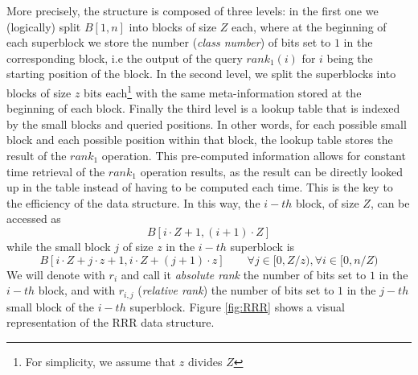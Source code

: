 More precisely, the structure is composed of three levels: in the first one we (logically) split $B[1, n]$ into blocks of size $Z$ each, where at the beginning of each superblock we store the number (\emph{class number}) of bits set to $1$ in the corresponding block, i.e the output of the query $rank_1(i)$ for $i$ being the starting position of the block. In the second level, we split the superblocks into blocks of size $z$ bits each\footnote{For simplicity, we assume that $z$ divides $Z$} with the same meta-information stored at the beginning of each block. Finally the third level is a lookup table that is indexed by the small blocks and queried positions. In other words, for each possible small block and each possible position within that block, the lookup table stores the result of the $rank_1$ operation. This pre-computed information allows for constant time retrieval of the $rank_1$ operation results, as the result can be directly looked up in the table instead of having to be computed each time. This is the key to the efficiency of the data structure. In this way, the $i-th$ block, of size $Z$, can be accessed as
\[
    B[i \cdot Z + 1, (i+1) \cdot Z]
\]
while the small block $j$ of size $z$ in the $i-th$ superblock is
\[
    B[i \cdot Z + j \cdot z + 1, i \cdot Z + (j+1) \cdot z] \qquad \forall j \in [0, Z/z), \forall i \in [0, n/Z)
\]
We will denote with $r_i$ and call it \emph{absolute rank} the number of bits set to $1$ in the $i-th$ block, and with $r_{i,j}$ (\emph{relative rank}) the number of bits set to $1$ in the $j-th$ small block of the $i-th$ superblock. Figure \ref{fig:RRR} shows a visual representation of the RRR data structure.

